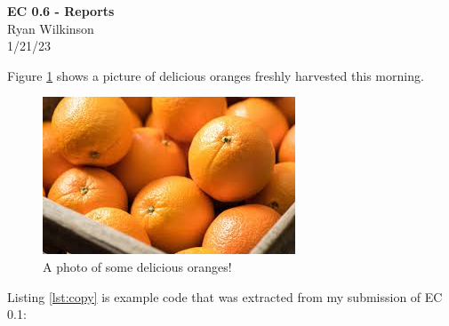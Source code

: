\documentclass[12pt]{article}
\begin{document}
\begin{centering}
{\large\textbf{EC 0.6 - Reports}}\\ 
Ryan Wilkinson\\
1/21/23\\
\end{centering}


Figure \ref{fig:web-growth} shows a picture of delicious oranges freshly harvested this morning.

\begin{figure}[h!]
    \centering
    \includegraphics[trim=0 20 10 50, clip, width=\textwidth] {oranges.jpg}
    \caption{A photo of some delicious oranges!}
    \label{fig:web-growth}
\end{figure}

Listing \ref{lst:copy} is example code that was extracted from my submission of EC 0.1:
\end{document}
